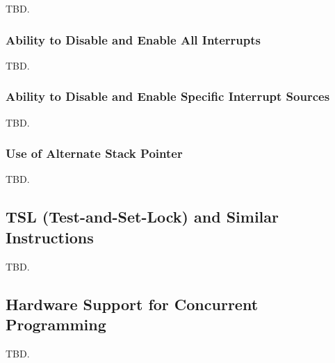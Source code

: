 TBD.


\subsubsection{Ability to Disable and Enable All Interrupts}
\label{scfp0:sint0:sdii0}

TBD.


\subsubsection{Ability to Disable and Enable Specific Interrupt Sources}
\label{scfp0:sint0:sdis0}

TBD.


\subsubsection{Use of Alternate Stack Pointer}
\label{scfp0:sint0:suas0}

TBD.


\subsection{TSL (Test-and-Set-Lock) and Similar Instructions}
\label{scfp0:stsl0}

TBD.



\subsection{Hardware Support for Concurrent Programming}
\label{scfp0:shsc0}

TBD.
